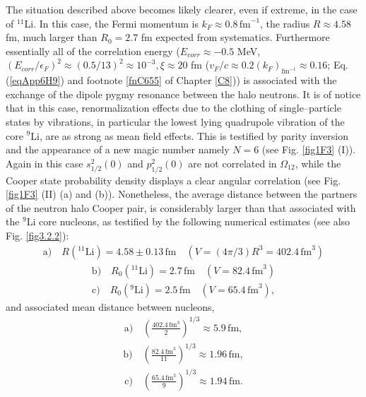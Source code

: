 The situation described above becomes likely clearer, even if extreme, in the case of $^{11}$Li. In this case, the Fermi momentum is $k_F\approx 0.8\, \text{fm}^{-1}$, the radius $R\approx 4.58 $fm, much larger than $R_0=2.7$ fm expected from systematics. Furthermore essentially all of the correlation energy ($E_{corr}\approx -0.5$ MeV, $(E_{corr}/\epsilon_F)^2\approx (0.5/13)^2\approx 10^{-3}, \xi\approx 20 $ fm ($v_F/c\approx0.2(k_F)_{\text{fm}^{-1}}\approx 0.16$; Eq. (\ref{eqApp6H9}) and footnote \ref{fnC655} of Chapter \ref{C8})) is associated with the exchange of the dipole pygmy resonance between the halo neutrons. It is of notice that in this case, renormalization effects due to the clothing of single--particle states by vibrations, in particular the lowest lying quadrupole vibration of the core $^9$Li, are as strong as mean field effects. This is testified by parity inversion and the appearance of a new magic number namely $N=6$ (see Fig. \ref{fig1F3} (I)). Again in this case $s_{1/2}^2(0)$ and $p_{1/2}^2(0)$ are not correlated in $\Omega_{12}$, while the Cooper state probability density displays a clear angular correlation (see Fig. \ref{fig1F3} (II) (a) and (b)). Nonetheless, the average distance between the partners of the neutron halo Cooper pair, is considerably larger than that associated with the $^9$Li core nucleons, as testified by the following numerical estimates (see also Fig. \ref{fig3.2.2}):
\begin{align}\label{eq3.2.21}
 \text{a)}\quad R(^{11}\text{Li})= 4.58\pm 0.13 \,\text{fm}\quad (V=\left(4\pi/3\right)R^3=402.4 \,\text{fm}^3)
\end{align}
\begin{align}
 \text{b)}\quad R_0 (^{11}\text{Li})=2.7\,\text{fm}\quad (V=82.4\,\text{fm}^3)
\end{align}
\begin{align}
 \text{c)}\quad R_0 (^{9}\text{Li})=2.5\,\text{fm}\quad (V=65.4\,\text{fm}^3),
\end{align}
and associated mean distance between nucleons, 
\begin{align}\label{eq3.2.24}
 \text{a)}\quad \left(\frac{402.4\,\text{fm}^3}{2}\right)^{1/3}\approx 5.9\,\text{fm},
\end{align}
\begin{align}
 \text{b)}\quad \left(\frac{82.4\,\text{fm}^3}{11}\right)^{1/3}\approx 1.96\,\text{fm},
\end{align}
\begin{align}
 \text{c)}\quad \left(\frac{65.4\,\text{fm}^3}{9}\right)^{1/3}\approx 1.94\,\text{fm}.
\end{align}




